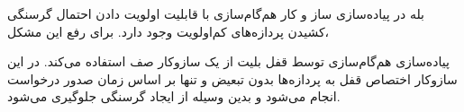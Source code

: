 بله در پیاده‌سازی ساز و کار هم‌گام‌سازی با قابلیت اولویت دادن احتمال گرسنگی کشیدن پردازه‌های کم‌اولویت وجود دارد. برای رفع این مشکل، 

پیاده‌سازی هم‌گام‌سازی توسط قفل بلیت از یک سازوکار صف
استفاده می‌کند. در این سازوکار اختصاص قفل به پردازه‌ها بدون تبعیض و تنها بر اساس زمان صدور درخواست انجام می‌شود و بدین وسیله از ایجاد گرسنگی جلوگیری می‌شود.